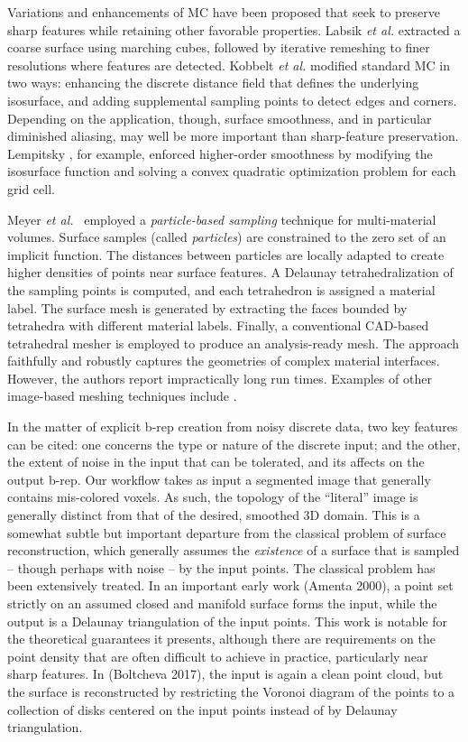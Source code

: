 Variations and enhancements of MC have been proposed that seek to preserve sharp features while retaining other favorable properties.  Labsik \textit{et al.} \cite{labsik_2002} extracted a coarse surface using marching cubes, followed by iterative remeshing to finer resolutions where features are detected.  Kobbelt \textit{et al.} \cite{kobbelt_2001} modified standard MC in two ways:  enhancing the discrete distance field that defines the underlying isosurface, and adding supplemental sampling points to detect edges and corners. Depending on the application, though, surface smoothness, and in particular diminished aliasing, may well be more important than sharp-feature preservation. Lempitsky \cite{lempitsky_2010}, for example, enforced higher-order smoothness by modifying the isosurface function and solving a convex quadratic optimization problem for each grid cell.

Meyer \textit{et al.}~\cite{meyer_2008} employed a \textit{particle-based sampling} technique for multi-material volumes. Surface samples (called \textit{particles}) are constrained to the zero set of an implicit function. The distances between particles are locally adapted to create higher densities of points near surface features. A Delaunay tetrahedralization of the sampling points is computed, and each tetrahedron is assigned a material label. The surface mesh is generated by extracting the faces bounded by tetrahedra with different material labels. Finally, a conventional CAD-based tetrahedral mesher is employed to produce an analysis-ready mesh. The approach faithfully and robustly captures the geometries of complex material interfaces. However, the authors report impractically long run times.
Examples of other image-based meshing techniques include \cite{fang_2009, mohamed_2004, jermyn_2013, boissonnat_2009}.

In the matter of explicit b-rep creation from noisy discrete data, two key features can be cited:  one concerns the type or nature of the discrete input; and the other, the extent of noise in the input that can be tolerated, and its affects on the output b-rep.  Our workflow takes as input a segmented image that generally contains mis-colored voxels.  As such, the topology of the ``literal'' image is generally distinct from that of the desired, smoothed 3D domain.  This is a somewhat subtle but important departure from the classical problem of surface reconstruction, which generally assumes the {\em existence} of a surface that is sampled -- though perhaps with noise -- by the input points.  The classical problem has been extensively treated.  In an important early work (Amenta 2000), a point set strictly on an assumed closed and manifold surface forms the input, while the output is a Delaunay triangulation of the input points.  This work is notable for the theoretical guarantees it presents, although there are requirements on the point density that are often difficult to achieve in practice, particularly near sharp features.  In (Boltcheva 2017), the input is again a clean point cloud, but the surface is reconstructed by restricting the Voronoi diagram of the points to a collection of disks centered on the input points instead of by Delaunay triangulation.

